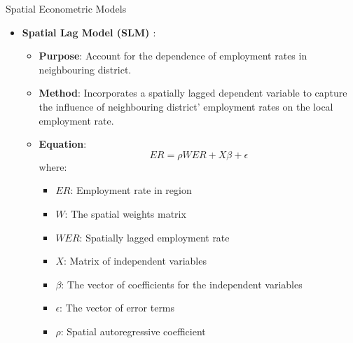 \documentclass[10pt]{beamer}
\begin{document}
\begin{frame}{Spatial Econometric Models}
    \begin{itemize}
        \item \textbf{Spatial Lag Model (SLM) \parencite{anselin1988}}:
        \begin{itemize}
            \item \textbf{Purpose}: Account for the dependence of employment rates in neighbouring district.
            \item \textbf{Method}: Incorporates a spatially lagged dependent variable to capture the influence of neighbouring district' employment rates on the local employment rate.
            \item \textbf{Equation}:
            \begin{equation}
                ER = \rho W ER + X \beta + \epsilon
            \end{equation}
            where:
            \begin{itemize}
                \item \(ER\): Employment rate in region 
                \item \(W\): The spatial weights matrix
                \item \(W ER\): Spatially lagged employment rate
                \item \(X\): Matrix of independent variables
                \item \(\beta\): The vector of coefficients for the independent variables
                \item \(\epsilon\): The vector of error terms
                \item \(\rho\): Spatial autoregressive coefficient
            \end{itemize}
        \end{itemize}
    \end{itemize}
\end{frame}
\end{document}
